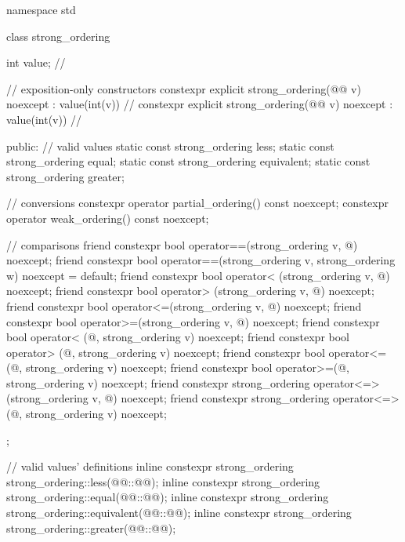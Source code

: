 %
%
%
%
%
\begin{codeblock}
namespace std {
  class strong_ordering {
    int value;  // \expos

    // exposition-only constructors
    constexpr explicit strong_ordering(@@ v) noexcept : value(int(v)) {}    // \expos
    constexpr explicit strong_ordering(@@ v) noexcept : value(int(v)) {}   // \expos

  public:
    // valid values
    static const strong_ordering less;
    static const strong_ordering equal;
    static const strong_ordering equivalent;
    static const strong_ordering greater;

    // conversions
    constexpr operator partial_ordering() const noexcept;
    constexpr operator weak_ordering() const noexcept;

    // comparisons
    friend constexpr bool operator==(strong_ordering v, @\unspec@) noexcept;
    friend constexpr bool operator==(strong_ordering v, strong_ordering w) noexcept = default;
    friend constexpr bool operator< (strong_ordering v, @\unspec@) noexcept;
    friend constexpr bool operator> (strong_ordering v, @\unspec@) noexcept;
    friend constexpr bool operator<=(strong_ordering v, @\unspec@) noexcept;
    friend constexpr bool operator>=(strong_ordering v, @\unspec@) noexcept;
    friend constexpr bool operator< (@\unspec@, strong_ordering v) noexcept;
    friend constexpr bool operator> (@\unspec@, strong_ordering v) noexcept;
    friend constexpr bool operator<=(@\unspec@, strong_ordering v) noexcept;
    friend constexpr bool operator>=(@\unspec@, strong_ordering v) noexcept;
    friend constexpr strong_ordering operator<=>(strong_ordering v, @\unspec@) noexcept;
    friend constexpr strong_ordering operator<=>(@\unspec@, strong_ordering v) noexcept;
  };

  // valid values' definitions
  inline constexpr strong_ordering strong_ordering::less(@@::@@);
  inline constexpr strong_ordering strong_ordering::equal(@@::@@);
  inline constexpr strong_ordering strong_ordering::equivalent(@@::@@);
  inline constexpr strong_ordering strong_ordering::greater(@@::@@);
}
\end{codeblock}

